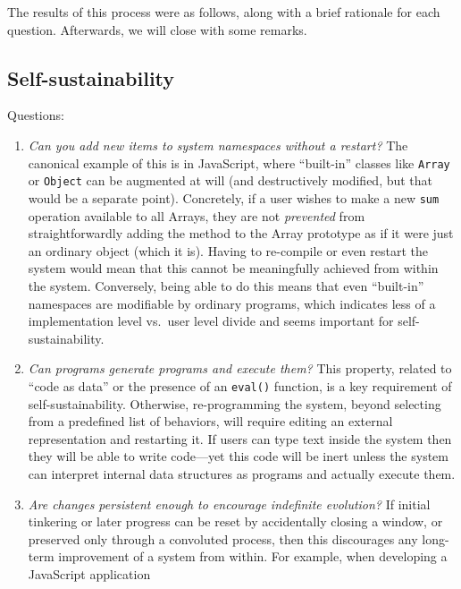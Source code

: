 \documentclass[english,submission]{programming}
\begin{document}
The results of this process were as follows, along with a brief
rationale for each question. Afterwards, we will close with some
remarks.

\newcommand{\y}{\ding{52}}
\newcommand{\n}{}

\hypertarget{self-sustainability}{%
\subsection{Self-sustainability}\label{self-sustainability}}

Questions:

\begin{enumerate}
\def\labelenumi{\arabic{enumi}.}
\tightlist
\item
  \emph{Can you add new items to system namespaces without a restart?}
  The canonical example of this is in JavaScript, where ``built-in''
  classes like \texttt{Array} or \texttt{Object} can be augmented at
  will (and destructively modified, but that would be a separate point).
  Concretely, if a user wishes to make a new \texttt{sum} operation
  available to all Arrays, they are not \emph{prevented} from
  straightforwardly adding the method to the Array prototype as if it
  were just an ordinary object (which it is). Having to re-compile or
  even restart the system would mean that this cannot be meaningfully
  achieved from within the system. Conversely, being able to do this
  means that even ``built-in'' namespaces are modifiable by ordinary
  programs, which indicates less of a implementation level vs.~user
  level divide and seems important for self-sustainability.
\item
  \emph{Can programs generate programs and execute them?} This property,
  related to ``code as data'' or the presence of an \texttt{eval()}
  function, is a key requirement of self-sustainability. Otherwise,
  re-programming the system, beyond selecting from a predefined list of
  behaviors, will require editing an external representation and
  restarting it. If users can type text inside the system then they will
  be able to write code---yet this code will be inert unless the system
  can interpret internal data structures as programs and actually
  execute them.
\item
  \emph{Are changes persistent enough to encourage indefinite
  evolution?} If initial tinkering or later progress can be reset by
  accidentally closing a window, or preserved only through a convoluted
  process, then this discourages any long-term improvement of a system
  from within. For example, when developing a JavaScript application

\end{enumerate}
\end{document}
